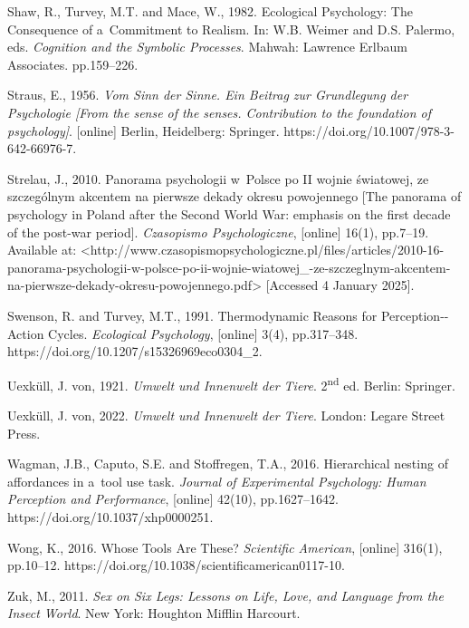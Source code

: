 Shaw, R., Turvey, M.T. and Mace, W., 1982. Ecological Psychology: The Consequence of a~Commitment to Realism. In: W.B. Weimer and D.S. Palermo, eds. \textit{Cognition and the Symbolic Processes}. Mahwah: Lawrence Erlbaum Associates. pp.159–226.



Straus, E., 1956. \textit{Vom Sinn der Sinne. Ein Beitrag zur Grundlegung der Psychologie [From the sense of the senses. Contribution to the foundation of psychology]}. [online] Berlin, Heidelberg: Springer. https://doi.org/10.1007/978-3-642-66976-7.



Strelau, J., 2010. Panorama psychologii w~Polsce po II wojnie światowej, ze szczególnym akcentem na pierwsze dekady okresu powojennego [The panorama of psychology in Poland after the Second World War: emphasis on the first decade of the post-war period]. \textit{Czasopismo Psychologiczne}, [online] 16(1), pp.7–19. Available at: {\textless}http://www.czasopismopsychologiczne.pl/files/articles/2010-16-panorama-psychologii-w-polsce-po-ii-wojnie-wiatowej\_-ze-szczeglnym-akcentem-na-pierwsze-dekady-okresu-powojennego.pdf{\textgreater} [Accessed 4 January 2025].



Swenson, R. and Turvey, M.T., 1991. Thermodynamic Reasons for Perception-{}-Action Cycles. \textit{Ecological Psychology}, [online] 3(4), pp.317–348. https://doi.org/10.1207/s15326969eco0304\_2.



Uexküll, J. von, 1921. \textit{Umwelt und Innenwelt der Tiere}. 2\textsuperscript{nd} ed. Berlin: Springer.



Uexküll, J. von, 2022. \textit{Umwelt und Innenwelt der Tiere}. London: Legare Street Press.



Wagman, J.B., Caputo, S.E. and Stoffregen, T.A., 2016. Hierarchical nesting of affordances in a~tool use task. \textit{Journal of Experimental Psychology: Human Perception and Performance}, [online] 42(10), pp.1627–1642. https://doi.org/10.1037/xhp0000251.



Wong, K., 2016. Whose Tools Are These? \textit{Scientific American}, [online] 316(1), pp.10–12. https://doi.org/10.1038/scientificamerican0117-10.



Zuk, M., 2011. \textit{Sex on Six Legs: Lessons on Life, Love, and Language from the Insect World}. New York: Houghton Mifflin Harcourt.



